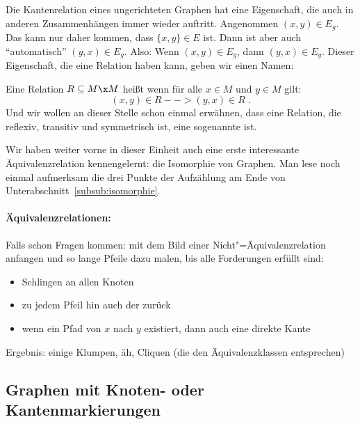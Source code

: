 Die Kantenrelation eines ungerichteten Graphen hat eine Eigenschaft,
die auch in anderen Zusammenhängen immer wieder auftritt.
% 
Angenommen $(x,y)\in E_g$.
% 
Das kann nur daher kommen, dass $\{x,y\}\in E$ ist.
% 
Dann ist aber auch "`automatisch"' $(y,x)\in E_g$.
% 
Also: Wenn $(x,y)\in E_g$, dann $(y,x)\in E_g$.
% 
Dieser Eigenschaft, die eine Relation haben kann, geben wir einen
Namen:

Eine Relation $R\subseteq M\x M$ heißt
 wenn für alle $x\in M$ und
$y\in M$ gilt:
\[ (x,y)\in R --> (y,x)\in R \;.
\]
% 
Und wir wollen an dieser Stelle schon einmal erwähnen, dass eine
Relation, die reflexiv, transitiv und symmetrisch ist, eine sogenannte
 ist.

Wir haben weiter vorne in dieser Einheit auch eine erste interessante
Äquivalenzrelation kennengelernt: die Isomorphie von Graphen.
% 
Man lese noch einmal aufmerksam die drei Punkte der Aufzählung am Ende
von Unterabschnitt~\ref{subsub:isomorphie}.

\begin{tutorium} 
  \paragraph{Äquivalenzrelationen:}

  Falls schon Fragen kommen: mit dem Bild einer
Nicht"=Äquivalenzrelation anfangen und so lange Pfeile dazu malen, bis
alle Forderungen erfüllt sind:
  \begin{itemize}
  \item Schlingen an allen Knoten
  \item zu jedem Pfeil hin auch der zurück
  \item wenn ein Pfad von $x$ nach $y$ existiert, dann auch eine
direkte Kante
  \end{itemize} Ergebnis: einige Klumpen, äh, Cliquen (die den
Äquivalenzklassen entsprechen)
\end{tutorium}

\begin{extract*}
  \section{Graphen mit Knoten- oder Kantenmarkierungen}
\end{extract*}
\label{sub:marked-graph}

